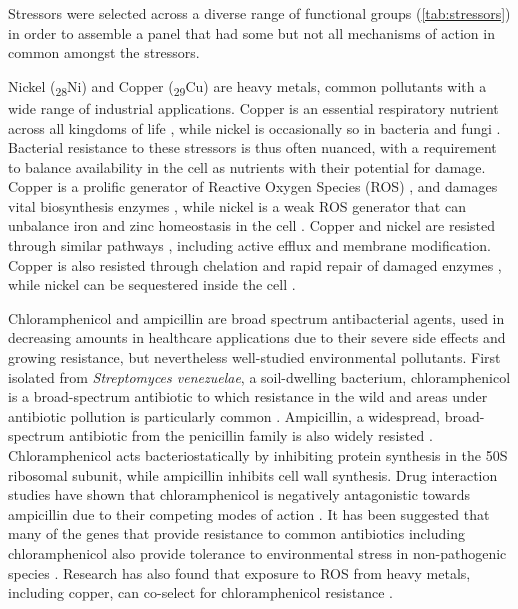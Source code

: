 \documentclass[final,1p,times]{elsarticle}
\begin{document}
Stressors were selected across a diverse range of functional groups (\cref{tab:stressors}) in order to assemble a panel that had some but not all mechanisms of action in common amongst the stressors.

Nickel (\textsubscript{28}Ni) and Copper (\textsubscript{29}Cu) are heavy metals, common pollutants with a wide range of industrial applications. Copper is an essential respiratory nutrient across all kingdoms of life \cite{Babcock1992}, while nickel is occasionally so in bacteria and fungi \cite{Zamble2015}. Bacterial resistance to these stressors is thus often nuanced, with a requirement to balance availability in the cell as nutrients with their potential for damage.  Copper is a prolific generator of Reactive Oxygen Species (ROS) \cite{Bal2002}, and damages vital biosynthesis enzymes \cite{Macomber2009}, while nickel is a weak ROS generator that can unbalance iron and zinc homeostasis in the cell \cite{Samland2006}. Copper and nickel are resisted through similar pathways \cite{Mykytczuk2011CytoplasmicFerrooxidans}, including active efflux and membrane modification. Copper is also resisted through chelation and rapid repair of damaged enzymes \cite{Macomber2009}, while nickel can be sequestered inside the cell \cite{Nishimura1998}.

Chloramphenicol and ampicillin are broad spectrum antibacterial agents, used in decreasing amounts in healthcare applications due to their severe side effects and growing resistance, but nevertheless well-studied environmental pollutants. First isolated from \textit{Streptomyces venezuelae}, a soil-dwelling bacterium, chloramphenicol is a broad-spectrum antibiotic to which resistance in the wild and areas under antibiotic pollution is particularly common \cite{Allen2010}. Ampicillin, a widespread, broad-spectrum antibiotic from the penicillin family is also widely resisted \cite{Ruiz1999MechanismsFish}. Chloramphenicol acts bacteriostatically by inhibiting protein synthesis in the 50S ribosomal subunit, while ampicillin inhibits cell wall synthesis. Drug interaction studies have shown that chloramphenicol is negatively antagonistic towards ampicillin due to their competing modes of action \cite{vanBambeke2017MechanismsAction}. It has been suggested that many of the genes that provide resistance to common antibiotics including chloramphenicol also provide tolerance to environmental stress in non-pathogenic species \cite{Groh2007}. Research has also found that exposure to ROS from heavy metals, including copper, can co-select for chloramphenicol resistance \cite{Harrison2009}.
\end{document}
